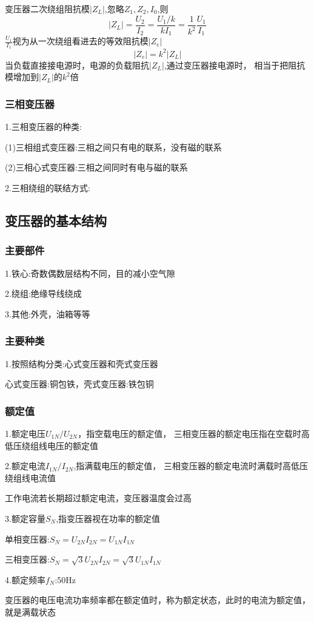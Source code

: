 \documentclass[11pt,twoside,a4paper]{ctexart}
\begin{document}
变压器二次绕组阻抗模$|Z_L| $,忽略$ Z_1,Z_2,I_0$,则
\[|Z_L| = \frac{U_2}{I_2} = \frac{U_1/k}{kI_1} = \frac{1}{k^2}\frac{U_1}{I_1} \]
$\frac{U_1}{I_1} $视为从一次绕组看进去的等效阻抗模$|Z_e| $
\[|Z_e| = k^2|Z_L| \]
当负载直接接电源时，电源的负载阻抗$|Z_L| $,通过变压器接电源时，
相当于把阻抗模增加到$|Z_L| $的$ k^2 $倍
\subsubsection{三相变压器}
1.三相变压器的种类:

(1)三相组式变压器:三相之间只有电的联系，没有磁的联系

(2)三相心式变压器:三相之间同时有电与磁的联系

2.三相绕组的联结方式:

\subsection{变压器的基本结构}
\subsubsection{主要部件}
1.铁心:奇数偶数层结构不同，目的减小空气隙

2.绕组:绝缘导线绕成

3.其他:外壳，油箱等等

\subsubsection{主要种类}
1.按照结构分类:心式变压器和壳式变压器

心式变压器:铜包铁，壳式变压器:铁包铜
\subsubsection{额定值}
1.额定电压$U_{1N} /U_{2N} $，指空载电压的额定值，
三相变压器的额定电压指在空载时高低压绕组线电压的额定值

2.额定电流$I_{1N} /I_{2N} $,指满载电压的额定值，
三相变压器的额定电流时满载时高低压绕组线电流值

工作电流若长期超过额定电流，变压器温度会过高

3.额定容量$S_N $,指变压器视在功率的额定值

单相变压器:$S_N = U_{2N}I_{2N} = U_{1N}I_{1N} $

三相变压器:$S_N =\sqrt{3}U_{2N}I_{2N} = \sqrt{3}U_{1N}I_{1N} $

4.额定频率$f_N $:50Hz

变压器的电压电流功率频率都在额定值时，称为额定状态，此时的电流为额定值，
就是满载状态
\end{document}
